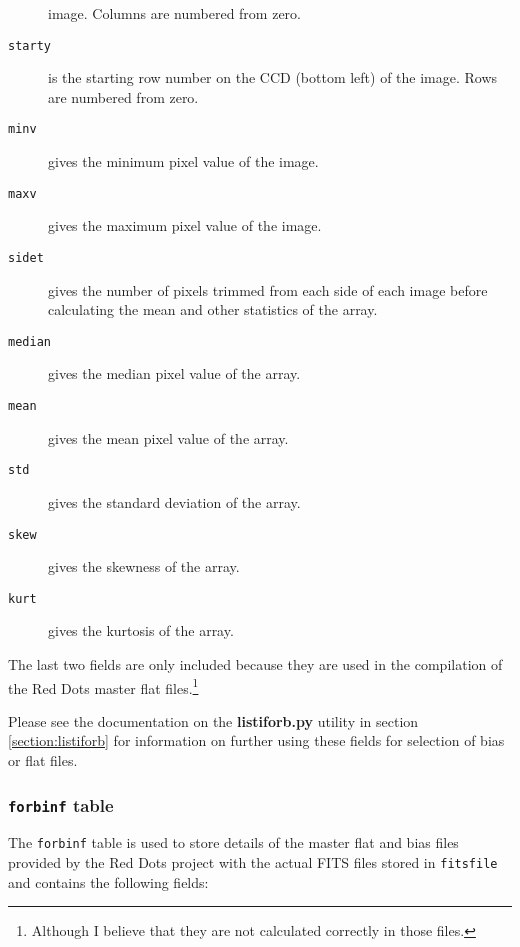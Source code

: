 \begin{description}
image. Columns are numbered from zero.
\item[\tt starty] is the starting row number on the CCD (bottom left) of the
image. Rows are numbered from zero.
\item[\tt minv] gives the minimum pixel value of the image.
\item[\tt maxv] gives the maximum pixel value of the image.
\item[\tt sidet] gives the number of pixels trimmed from each side of each image
before calculating the mean and other statistics of the array.
\item[\tt median] gives the median pixel value of the array.
\item[\tt mean] gives the mean pixel value of the array.
\item[\tt std] gives the standard deviation of the array.
\item[\tt skew] gives the skewness of the array.
\item[\tt kurt] gives the kurtosis of the array.
\end{description}

The last two fields are only included because they are used in the compilation of the Red Dots
master flat files.\footnote{Although I believe that they are not calculated
correctly in those files.}

Please see the documentation on the \textbf{listiforb.py} utility in section
\ref{section:listiforb} for information on further using these fields for
selection of bias or flat files.

\subsubsection{\texttt{forbinf} table}
\protect\label{section:forbinf}

The \texttt{forbinf} table is used to store details of the master flat and
bias files provided by the Red Dots project with the actual FITS files stored in
\texttt{fitsfile} and contains the following fields:

